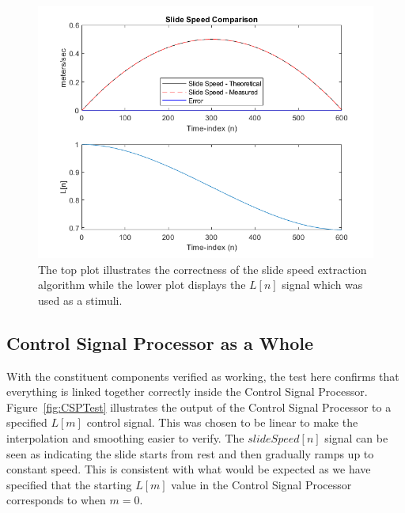 \documentclass[../main.tex]{subfiles}
\begin{document}
\begin{figure}[h]
    \centering
    \includegraphics[scale=.65]{./images/plots/SlideSpeedExtractorTest.png}
    \caption{The top plot illustrates the correctness of the slide speed extraction algorithm while the lower plot displays the $L[n]$ signal which was used as a stimuli.}
    \label{fig:SlideSpeedTest}
\end{figure}

\subsection{Control Signal Processor as a Whole}
With the constituent components verified as working, the test here confirms that everything is linked together correctly inside the Control Signal Processor. Figure~\ref{fig:CSPTest} illustrates the output of the Control Signal Processor to a specified $L[m]$ control signal. This was chosen to be linear to make the interpolation and smoothing easier to verify. The $slideSpeed[n]$ signal can be seen as indicating the slide starts from rest and then gradually ramps up to constant speed. This is consistent with what would be expected as we have specified that the starting $L[m]$ value in the Control Signal Processor corresponds to when $m = 0$.
\end{document}

